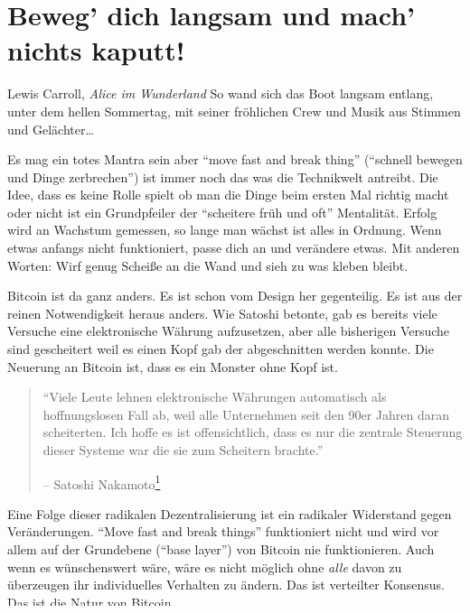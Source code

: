 \chapter{Beweg’ dich langsam und mach’ nichts kaputt!}
\label{les:18}

\begin{chapquote}{Lewis Carroll, \textit{Alice im Wunderland}}
So wand sich das Boot langsam entlang, unter dem hellen Sommertag, mit seiner
fröhlichen Crew und Musik aus Stimmen und Gelächter\ldots
\end{chapquote}

Es mag ein totes Mantra sein aber \enquote{move fast and break thing}
(\enquote{schnell bewegen und Dinge zerbrechen}) ist immer noch das was die
Technikwelt antreibt. Die Idee, dass es keine Rolle spielt ob man die Dinge beim
ersten Mal richtig macht oder nicht ist ein Grundpfeiler der \enquote{scheitere
früh und oft} Mentalität. Erfolg wird an Wachstum gemessen, so lange man wächst
ist alles in Ordnung. Wenn etwas anfangs nicht funktioniert, passe dich an und
verändere etwas. Mit anderen Worten: Wirf genug Scheiße an die Wand und sieh zu
was kleben bleibt.

Bitcoin ist da ganz anders. Es ist schon vom Design her gegenteilig. Es ist aus
der reinen Notwendigkeit heraus anders. Wie Satoshi betonte, gab es bereits
viele Versuche eine elektronische Währung aufzusetzen, aber alle bisherigen
Versuche sind gescheitert weil es einen Kopf gab der abgeschnitten werden
konnte. Die Neuerung an Bitcoin ist, dass es ein Monster ohne Kopf ist.

\begin{quotation}\begin{samepage}
\enquote{Viele Leute lehnen elektronische Währungen automatisch als
hoffnungslosen Fall ab, weil alle Unternehmen seit den 90er Jahren daran
scheiterten. Ich hoffe es ist offensichtlich, dass es nur die zentrale Steuerung
dieser Systeme war die sie zum Scheitern brachte.}
\begin{flushright} -- Satoshi Nakamoto\footnote{Satoshi Nakamoto, in einer
Antwort auf eine Frage von Sepp Hasslberger \cite{satoshi-centralized-nature}}
\end{flushright}\end{samepage}\end{quotation}

Eine Folge dieser radikalen Dezentralisierung ist ein radikaler Widerstand gegen
Veränderungen. \enquote{Move fast and break things} funktioniert nicht und wird
vor allem auf der Grundebene (\enquote{base layer}) von Bitcoin nie
funktionieren. Auch wenn es wünschenswert wäre, wäre es nicht möglich ohne
\textit{alle} davon zu überzeugen ihr individuelles Verhalten zu ändern. Das ist
verteilter Konsensus. Das ist die Natur von Bitcoin.

